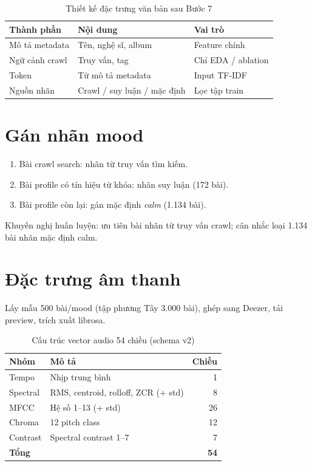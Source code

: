 \begin{table}[htbp]
  \centering
  \caption{Thiết kế đặc trưng văn bản sau Bước 7}
  \label{tab:text-columns}
  \begin{tabularx}{\textwidth}{@{}L{3.5cm}X L{3cm}@{}}
    \toprule
    \textbf{Thành phần} & \textbf{Nội dung} & \textbf{Vai trò} \\
    \midrule
    Mô tả metadata & Tên, nghệ sĩ, album & Feature chính \\
    Ngữ cảnh crawl & Truy vấn, tag & Chỉ EDA / ablation \\
    Token & Từ mô tả metadata & Input TF-IDF \\
    Nguồn nhãn & Crawl / suy luận / mặc định & Lọc tập train \\
    \bottomrule
  \end{tabularx}
\end{table}

\section{Gán nhãn mood}

\begin{enumerate}[label=\arabic*.]
  \item Bài crawl search: nhãn từ truy vấn tìm kiếm.
  \item Bài profile có tín hiệu từ khóa: nhãn suy luận (172 bài).
  \item Bài profile còn lại: gán mặc định \textit{calm} (1.134 bài).
\end{enumerate}

Khuyến nghị huấn luyện: ưu tiên bài nhãn từ truy vấn crawl; cân nhắc loại 1.134 bài nhãn mặc định calm.

\section{Đặc trưng âm thanh}

Lấy mẫu 500 bài/mood (tập phương Tây 3.000 bài), ghép sang Deezer, tải preview, trích xuất librosa.

\begin{table}[htbp]
  \centering
  \caption{Cấu trúc vector audio 54 chiều (schema v2)}
  \label{tab:audio-features}
  \begin{tabular}{@{}llr@{}}
    \toprule
    \textbf{Nhóm} & \textbf{Mô tả} & \textbf{Chiều} \\
    \midrule
    Tempo & Nhịp trung bình & 1 \\
    Spectral & RMS, centroid, rolloff, ZCR (+ std) & 8 \\
    MFCC & Hệ số 1--13 (+ std) & 26 \\
    Chroma & 12 pitch class & 12 \\
    Contrast & Spectral contrast 1--7 & 7 \\
    \midrule
    \textbf{Tổng} & & \textbf{54} \\
    \bottomrule
  \end{tabular}
\end{table}

